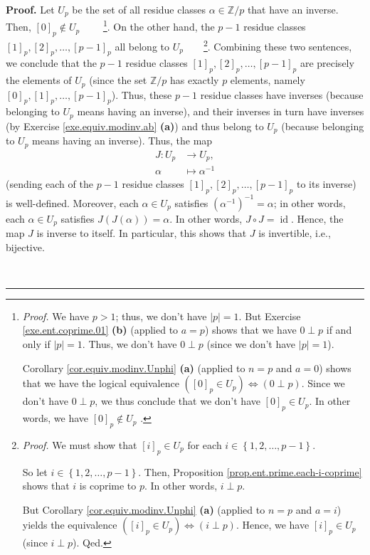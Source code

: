 \documentclass[numbers=enddot,12pt,final,onecolumn,notitlepage]{scrartcl}%
\numberwithin{exer}{subsection}
\theoremstyle{definition}
\newenvironment{proof}[1][Proof]{\noindent\textbf{#1.} }{\ \rule{0.5em}{0.5em}}
\begin{document}
\begin{proof}
Let $U_{p}$ be the set of all residue classes $\alpha\in\mathbb{Z}/p$ that
have an inverse. Then, $\left[  0\right]  _{p}\notin U_{p}$%
\ \ \ \ \footnote{\textit{Proof.} We have $p>1$; thus, we don't have
$\left\vert p\right\vert =1$. But Exercise \ref{exe.ent.coprime.01}
\textbf{(b)} (applied to $a=p$) shows that we have $0\perp p$ if and only if
$\left\vert p\right\vert =1$. Thus, we don't have $0\perp p$ (since we don't
have $\left\vert p\right\vert =1$).
\par
Corollary \ref{cor.equiv.modinv.Unphi} \textbf{(a)} (applied to $n=p$ and
$a=0$) shows that we have the logical equivalence $\left(  \left[  0\right]
_{p}\in U_{p}\right)  \Longleftrightarrow\left(  0\perp p\right)  $. Since we
don't have $0\perp p$, we thus conclude that we don't have $\left[  0\right]
_{p}\in U_{p}$. In other words, we have $\left[  0\right]  _{p}\notin U_{p}$%
.}. On the other hand, the $p-1$ residue classes $\left[  1\right]
_{p},\left[  2\right]  _{p},\ldots,\left[  p-1\right]  _{p}$ all belong to
$U_{p}$\ \ \ \ \footnote{\textit{Proof.} We must show that $\left[  i\right]
_{p}\in U_{p}$ for each $i\in\left\{  1,2,\ldots,p-1\right\}  $.
\par
So let $i\in\left\{  1,2,\ldots,p-1\right\}  $. Then, Proposition
\ref{prop.ent.prime.each-i-coprime} shows that $i$ is coprime to $p$. In other
words, $i\perp p$.
\par
But Corollary \ref{cor.equiv.modinv.Unphi} \textbf{(a)} (applied to $n=p$ and
$a=i$) yields the equivalence $\left(  \left[  i\right]  _{p}\in U_{p}\right)
\Longleftrightarrow\left(  i\perp p\right)  $. Hence, we have $\left[
i\right]  _{p}\in U_{p}$ (since $i\perp p$). Qed.}. Combining these two
sentences, we conclude that the $p-1$ residue classes $\left[  1\right]
_{p},\left[  2\right]  _{p},\ldots,\left[  p-1\right]  _{p}$ are precisely the
elements of $U_{p}$ (since the set $\mathbb{Z}/p$ has exactly $p$ elements,
namely $\left[  0\right]  _{p},\left[  1\right]  _{p},\ldots,\left[
p-1\right]  _{p}$). Thus, these $p-1$ residue classes have inverses (because
belonging to $U_{p}$ means having an inverse), and their inverses in turn have
inverses (by Exercise \ref{exe.equiv.modinv.ab} \textbf{(a)}) and thus belong
to $U_{p}$ (because belonging to $U_{p}$ means having an inverse). Thus, the
map%
\begin{align*}
J:U_{p}  &  \rightarrow U_{p},\\
\alpha &  \mapsto\alpha^{-1}%
\end{align*}
(sending each of the $p-1$ residue classes $\left[  1\right]  _{p},\left[
2\right]  _{p},\ldots,\left[  p-1\right]  _{p}$ to its inverse) is
well-defined. Moreover, each $\alpha\in U_{p}$ satisfies $\left(  \alpha
^{-1}\right)  ^{-1}=\alpha$; in other words, each $\alpha\in U_{p}$ satisfies
$J\left(  J\left(  \alpha\right)  \right)  =\alpha$. In other words, $J\circ
J=\operatorname*{id}$. Hence, the map $J$ is inverse to itself. In particular,
this shows that $J$ is invertible, i.e., bijective.


\end{proof}
\end{document}
